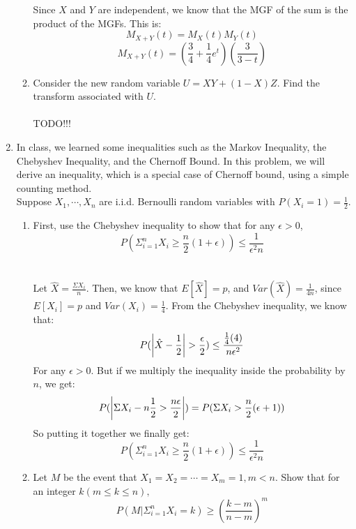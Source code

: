 \begin{enumerate}
\begin{enumerate}
        Since $X$ and $Y$ are independent, we know that the MGF of the sum is the product of the MGFs. This is:
        $$M_{X+Y}(t) = M_X(t)M_Y(t)$$
        $$M_{X+Y}(t) = (\frac{3}{4} + \frac{1}{4}e^t)(\frac{3}{3-t})$$

      \item Consider the new random variable $U = XY + (1-X)Z$. Find the transform associated with $U$.\\\\
        TODO!!!
    \end{enumerate}

  \item In class, we learned some inequalities such as the Markov Inequality, the Chebyshev Inequality, and the Chernoff Bound. In this problem, we will derive an inequality, which is a special case of Chernoff bound, using a simple counting method.\\
    Suppose $X_1, \cdots, X_n$ are i.i.d. Bernoulli random variables with $P(X_i = 1) = \frac{1}{2}$.
    \begin{enumerate}
      \item First, use the Chebyshev inequality to show that for any $\epsilon > 0$,
        $$P(\Sigma_{i=1}^n X_i \geq \frac{n}{2}(1 + \epsilon)) \leq \frac{1}{\epsilon^2 n}$$\\\\

        Let $\hat{X} = \frac{\Sigma X_i}{n}$. Then, we know that $E[\hat{X}] = p$, and $Var(\hat{X}) = \frac{1}{4n}$, since $E[X_i] = p$ and $Var(X_i) = \frac{1}{4}$. From the Chebyshev inequality, we know that:
        $$P(\left\vert \hat{X} - \frac{1}{2} \right\vert > \frac{\epsilon}{2}) \leq \frac{\frac{1}{4}(4)}{n \epsilon^2}$$
        For any $\epsilon > 0$. But if we multiply the inequality inside the probability by $n$, we get:
        $$P(\left\vert \Sigma X_i - n \frac{1}{2} > \frac{n \epsilon}{2} \right\vert) = P(\Sigma X_i > \frac{n}{2}(\epsilon + 1))$$
        So putting it together we finally get:
        $$P(\Sigma_{i=1}^n X_i \geq \frac{n}{2}(1 + \epsilon)) \leq \frac{1}{\epsilon^2 n}$$

      \item Let $M$ be the event that $X_1 = X_2 = \cdots = X_m = 1, m < n$. Show that for an integer $k (m \leq k \leq n),$
        $$P(M | \Sigma_{i=1}^n X_i = k) \geq (\frac{k-m}{n-m})^m$$\\\\


\end{enumerate}
\end{enumerate}
